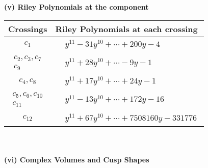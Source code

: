 \documentclass[1p]{elsarticle_modified}
\theoremstyle{definition}
\begin{document}
\newpage\renewcommand{\arraystretch}{1}
\flushleft \textbf{(v) Riley Polynomials at the component}\newline \\
\begin{tabular}{m{50pt}|m{274pt}}
Crossings & \hspace{64pt}Riley Polynomials at each crossing \\
\hline $$\begin{aligned}c_{1}\end{aligned}$$&$\begin{aligned}
&y^{11}-31 y^{10}+\cdots+200 y-4
\end{aligned}$\\
\hline $$\begin{aligned}c_{2},c_{3},c_{7}\\c_{9}\end{aligned}$$&$\begin{aligned}
&y^{11}+28 y^{10}+\cdots-9 y-1
\end{aligned}$\\
\hline $$\begin{aligned}c_{4},c_{8}\end{aligned}$$&$\begin{aligned}
&y^{11}+17 y^{10}+\cdots+24 y-1
\end{aligned}$\\
\hline $$\begin{aligned}c_{5},c_{6},c_{10}\\c_{11}\end{aligned}$$&$\begin{aligned}
&y^{11}-13 y^{10}+\cdots+172 y-16
\end{aligned}$\\
\hline $$\begin{aligned}c_{12}\end{aligned}$$&$\begin{aligned}
&y^{11}+67 y^{10}+\cdots+7508160 y-331776
\end{aligned}$\\
\hline
\end{tabular}\\~\\
\newpage\flushleft \textbf{(vi) Complex Volumes and Cusp Shapes}
\end{document}
